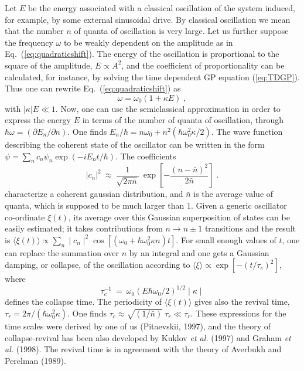 Let $E$ be the energy associated with a classical oscillation of the
system induced, for example, by some external sinusoidal drive. By
classical oscillation we mean that the number $n$ of quanta of
oscillation is very large. Let us further suppose  the frequency
$\omega$ to be weakly dependent on the amplitude as in
Eq.~(\ref{eq:quadraticshift}). The energy of the oscillation is
proportional to the square of the amplitude, $E \propto A^2$, and
the coefficient of proportionality can be calculated, for instance, by
solving the time dependent GP equation (\ref{eq:TDGP}). Thus one can
rewrite Eq.~(\ref{eq:quadraticshift}) as
\begin{equation}
\omega = \omega _0 (1+\kappa E) \; ,
\label{eq:cl}
\end{equation}
with $|\kappa | E \ll 1$. Now, one can use the semiclassical
approximation in order to express the energy $E$ in terms of the
number of quanta of oscillation, through $\hbar \omega = (\partial 
E_n/\partial n)$. One finds  $E_n/\hbar= n \omega _0 +n^2(\hbar
\omega _0^2 \kappa/2)$. The wave function describing the coherent
state of the oscillator can be written in the form
$\psi = \sum_n c_n \psi_n \exp(-i E_n t/\hbar)$. The coefficients
\begin{equation}
| c _n |^2 \ \approx \ \frac{1}{\sqrt{2\pi
\bar{n}}} \ \exp \left[ -\frac{(n-\bar{n})^2}{2\bar{n}} \right] \; .
\label{eq:cn2}
\end{equation}
characterize a coherent  gaussian distribution, and $\bar{n}$ is the
average value of quanta,  which is supposed to be much larger than $1$. 
Given a generic oscillator co-ordinate $\xi(t)$, its average over this
Gaussian superposition of states can be easily estimated; it takes
contributions  from $n \rightarrow n \pm 1$ transitions and the result
is $\langle \xi (t) \rangle \propto  \sum _n\mid c _n \mid ^2 \cos
[(\omega _0 + \hbar \omega_0^2 \kappa n)t]$.  For small enough values
of $t$,  one can replace the summation over $n$ by an integral and
one gets a Gaussian damping, or collapse, of the oscillation according
to $\langle \xi \rangle \propto \exp[-(t/\tau _c)^2]$,  where
\begin{equation}
\tau_c ^{-1}  \ = \ \omega _0  (E \hbar \omega _0/2)^{1/2} \mid \kappa \mid 
\label{eq:tauc}
\end{equation}
defines the collapse time.
The periodicity of $\langle \xi (t) \rangle$ gives also the revival
time, $\tau _r = 2\pi/(\hbar \omega_0^2 \kappa)$.  One finds $\tau_c
\approx \sqrt{(1/\bar{n})} \ \tau_r \ll \tau_r$. These expressions
for the time scales were derived by one of us (Pitaevskii, 1997),
and the theory of collapse-revival has been also developed by Kuklov
{\it et al.} (1997) and Graham {\it et al.} (1998).  The revival
time is in agreement with the theory of Averbukh and Perelman
(1989).

